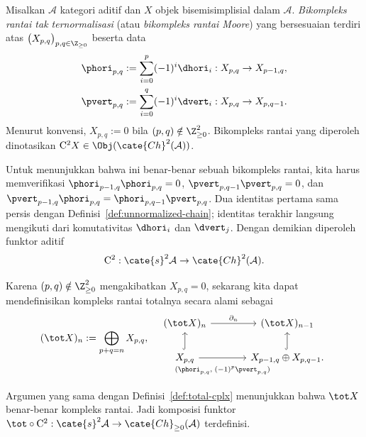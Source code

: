 \begin{definition}
	Misalkan $\mathcal{A}$ kategori aditif dan $X$ objek bisemisimplisial
	dalam $\mathcal{A}$. \emph{Bikompleks rantai tak ternormalisasi} (atau
	\emph{bikompleks rantai Moore}) yang bersesuaian terdiri atas
	$\bigl(X_{p,q}\bigr)_{p,q\in\Z_{\geq0}}$ beserta data
	\begin{align*}
		\phori_{p, q} & := \sum_{i=0}^p (-1)^i \dhori_i: X_{p, q} \to X_{p-1, q}, \\
		\pvert_{p, q} & := \sum_{i=0}^q (-1)^i \dvert_i: X_{p, q} \to X_{p, q-1}.
	\end{align*}
	Menurut konvensi, $X_{p,q}:=0$ bila
	$(p,q)\notin\Z_{\geq0}^2$. Bikompleks rantai yang diperoleh dinotasikan
	$\mathrm{C}^2X\in\Obj(\cate{Ch}^2(\mathcal{A}))$.
\end{definition}

Untuk menunjukkan bahwa ini benar-benar sebuah bikompleks rantai, kita
harus memverifikasi
$\phori_{p-1,q}\phori_{p,q}=0$,
$\pvert_{p,q-1}\pvert_{p,q}=0$, dan
$\pvert_{p-1,q}\phori_{p,q}=\phori_{p,q-1}\pvert_{p,q}$. Dua identitas
pertama sama persis dengan Definisi~\ref{def:unnormalized-chain}; identitas
terakhir langsung mengikuti dari komutativitas $\dhori_i$ dan $\dvert_j$.
Dengan demikian diperoleh funktor aditif
\[ \mathrm{C}^2: \cate{s}^2 \mathcal{A} \to \cate{Ch}^2(\mathcal{A}). \]

Karena $(p,q)\notin\Z_{\geq0}^2$ mengakibatkan $X_{p,q}=0$, sekarang kita
dapat mendefinisikan kompleks rantai totalnya secara alami sebagai
\[ (\tot X)_n := \bigoplus_{p+q = n} X_{p, q}, \quad
\begin{tikzcd}[column sep=large]
	(\tot X)_n \arrow[r, "{\partial_n}"] & (\tot X)_{n-1} \\
	X_{p,q} \arrow[hookrightarrow, u] \arrow[r, "{(\phori_{p, q}, \; (-1)^p \pvert_{p, q})}"' inner sep=0.8em] & X_{p-1, q} \oplus X_{p, q-1} . \arrow[hookrightarrow, u]
\end{tikzcd}\]
Argumen yang sama dengan Definisi~\ref{def:total-cplx} menunjukkan bahwa
$\tot X$ benar-benar kompleks rantai. Jadi komposisi funktor
$\tot\circ\mathrm{C}^2:\cate{s}^2\mathcal{A}\to
\cate{Ch}_{\geq0}(\mathcal{A})$ terdefinisi.

